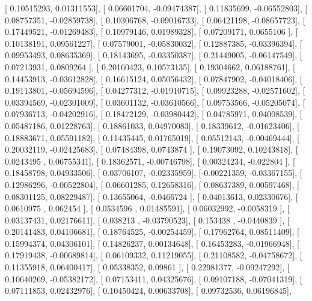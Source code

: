 \documentclass{article}
\begin{document}
       [ 0.10515293,  0.01311553],
       [ 0.06601704, -0.09474387],
       [ 0.11835699, -0.06552803],
       [ 0.08757351, -0.02859738],
       [ 0.10306768, -0.09016733],
       [ 0.06421198, -0.08657723],
       [ 0.17449521, -0.01269483],
       [ 0.10979146,  0.01989328],
       [ 0.07209171,  0.0655106 ],
       [ 0.10138191,  0.09561227],
       [ 0.07579001, -0.05830032],
       [ 0.12887385, -0.03396394],
       [ 0.09953493,  0.08635369],
       [ 0.18143695, -0.03350387],
       [ 0.21449005, -0.06147549],
       [ 0.07213931,  0.0809264 ],
       [ 0.20160423,  0.10573135],
       [ 0.19304662,  0.06188761],
       [ 0.14453913, -0.03612828],
       [ 0.16615124,  0.05056432],
       [ 0.07847902, -0.04018406],
       [ 0.19113801, -0.05694596],
       [ 0.04277312, -0.01910715],
       [ 0.09923288, -0.02571602],
       [ 0.03394569, -0.02301009],
       [ 0.03601132, -0.03610566],
       [ 0.09753566, -0.05205074],
       [ 0.07936713, -0.04202916],
       [ 0.18472129, -0.03980442],
       [ 0.04785971,  0.04008539],
       [ 0.05487186,  0.01228763],
       [ 0.18861033,  0.04970083],
       [ 0.18339612, -0.01623406],
       [ 0.18883671,  0.05591182],
       [ 0.11435445,  0.01765019],
       [ 0.05512143, -0.00469444],
       [ 0.20032119, -0.02425683],
       [ 0.07484398,  0.0743874 ],
       [ 0.19073092,  0.10243818],
       [ 0.0243495 ,  0.06755341],
       [ 0.18362571, -0.00746798],
       [ 0.00324234, -0.022804  ],
       [ 0.18458798,  0.04933506],
       [ 0.03706107, -0.02335959],
       [-0.00221359, -0.03367155],
       [ 0.12986296, -0.00522804],
       [ 0.06601285,  0.12658316],
       [ 0.08637389,  0.00597468],
       [ 0.08301125,  0.08229487],
       [ 0.13655064, -0.0466724 ],
       [ 0.04013613,  0.02330676],
       [ 0.0610975 ,  0.062454  ],
       [ 0.0534596 ,  0.01485591],
       [ 0.06032992, -0.0058319 ],
       [ 0.03137431,  0.02176611],
       [ 0.038213  , -0.03790523],
       [ 0.153438  , -0.0440839 ],
       [ 0.20141483,  0.04106681],
       [ 0.18764525, -0.00254459],
       [ 0.17962764,  0.08511409],
       [ 0.15994374,  0.04306101],
       [ 0.14826237,  0.00134648],
       [ 0.16453283, -0.01966948],
       [ 0.17919438, -0.00689814],
       [ 0.06109332,  0.11219055],
       [ 0.21108582, -0.04758672],
       [ 0.11355918,  0.06400417],
       [ 0.05338352,  0.09861   ],
       [ 0.22981377, -0.09247292],
       [ 0.10640269, -0.05382172],
       [ 0.07153411,  0.04325676],
       [ 0.09107188, -0.07041319],
       [ 0.07111853,  0.02432976],
       [ 0.10450424,  0.00633708],
       [ 0.09732536,  0.06196845],
\end{document}
